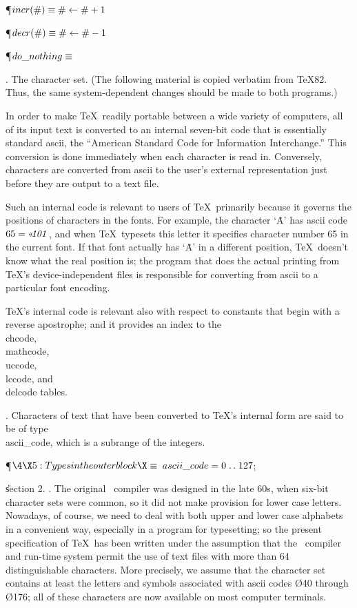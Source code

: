 \Y\P\D {}$\\{incr}(\#)\S\#\K\#+1$\par
\P\D {}$\\{decr}(\#)\S\#\K\#-1$\par
\P\D {}$\\{do\_nothing}\S$\par
\fi
{}.  The character set.
(The following material is copied verbatim from \TeX82.
Thus, the same system-dependent changes should be made to both programs.)

In order to make \TeX\ readily portable between a wide variety of
computers, all of its input text is converted to an internal seven-bit
code that is essentially standard ascii, the ``American Standard Code for
Information Interchange.''  This conversion is done immediately when each
character is read in. Conversely, characters are converted from ascii to
the user's external representation just before they are output to a
text file.

Such an internal code is relevant to users of \TeX\ primarily because it
governs the positions of characters in the fonts. For example, the
character `\.A' has ascii code $65=\O{101}$, and when \TeX\ typesets
this letter it specifies character number 65 in the current font.
If that font actually has `\.A' in a different position, \TeX\ doesn't
know what the real position is; the program that does the actual printing from
\TeX's device-independent files is responsible for converting from ascii to
a particular font encoding.

\TeX's internal code is relevant also with respect to constants
that begin with a reverse apostrophe; and it provides an index to the
\.{\\chcode}, \.{\\mathcode}, \.{\\uccode}, \.{\\lccode}, and \.{\\delcode}
tables.

\fi
{}. Characters of text that have been converted to \TeX's internal form
are said to be of type \\{ascii\_code}, which is a subrange of the integers.

\Y\P$\4\X5:Types in the outer block\X\S$\6
$\\{ascii\_code}=0\to127$;\par
\U section 2.\fi
{}. The original \PASCAL\ compiler was designed in the late 60s, when six-bit
character sets were common, so it did not make provision for lower case
letters. Nowadays, of course, we need to deal with both upper and lower case
alphabets in a convenient way, especially in a program for typesetting;
so the present specification of \TeX\ has been written under the assumption
that the \PASCAL\ compiler and run-time system permit the use of text files
with more than 64 distinguishable characters. More precisely, we assume that
the character set contains at least the letters and symbols associated
with ascii codes \O{40} through \O{176}; all of these characters are now
available on most computer terminals.

